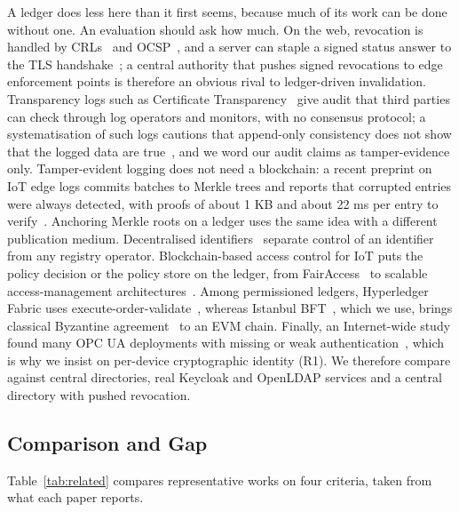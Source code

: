 \documentclass[a4paper,5p,times,twocolumn,number,sort&compress]{elsarticle}
\begin{document}
A ledger does less here than it first seems, because much of its work can be done without one. An evaluation should ask how much. On the web, revocation is handled by CRLs~\cite{rfc5280} and OCSP~\cite{rfc6960}, and a server can staple a signed status answer to the TLS handshake~\cite{rfc6066}; a central authority that pushes signed revocations to edge enforcement points is therefore an obvious rival to ledger-driven invalidation. Transparency logs such as Certificate Transparency~\cite{rfc6962} give audit that third parties can check through log operators and monitors, with no consensus protocol; a systematisation of such logs cautions that append-only consistency does not show that the logged data are true~\cite{hicks23}, and we word our audit claims as tamper-evidence only. Tamper-evident logging does not need a blockchain: a recent preprint on IoT edge logs commits batches to Merkle trees and reports that corrupted entries were always detected, with proofs of about 1 KB and about 22 ms per entry to verify~\cite{yagiz26}. Anchoring Merkle roots on a ledger uses the same idea with a different publication medium. Decentralised identifiers~\cite{did} separate control of an identifier from any registry operator. Blockchain-based access control for IoT puts the policy decision or the policy store on the ledger, from FairAccess~\cite{ouaddah} to scalable access-management architectures~\cite{novo}. Among permissioned ledgers, Hyperledger Fabric uses execute-order-validate~\cite{fabric}, whereas Istanbul BFT~\cite{moniz}, which we use, brings classical Byzantine agreement~\cite{pbft} to an EVM chain. Finally, an Internet-wide study found many OPC UA deployments with missing or weak authentication~\cite{dahlmanns}, which is why we insist on per-device cryptographic identity (R1). We therefore compare against central directories, real Keycloak and OpenLDAP services and a central directory with pushed revocation.

\subsection{Comparison and Gap}

Table~\ref{tab:related} compares representative works on four criteria, taken from what each paper reports.
\end{document}
